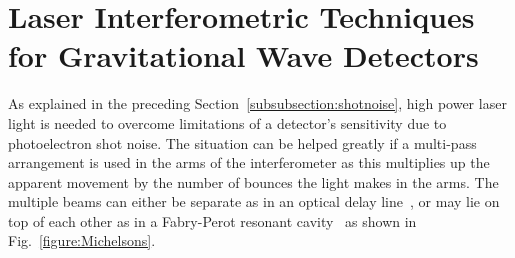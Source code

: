 \documentclass{article}
\begin{document}
\newpage

\section{Laser Interferometric Techniques for Gravitational Wave Detectors}
\label{section:interferometry}

As explained in the preceding Section~\ref{subsubsection:shotnoise}, high power
laser light is needed to overcome limitations of a detector's sensitivity due to
photoelectron shot noise. The situation can be helped greatly if a multi-pass
arrangement is used in the arms of the interferometer as this multiplies up the
apparent movement by the number of bounces the light makes in the arms. The
multiple beams can either be separate as in an optical delay line~\cite{Weiss,
Billing}, or may lie on top of each other as in a Fabry-Perot resonant
cavity~\cite{Drever2} as shown in Fig.~\ref{figure:Michelsons}.
\end{document}
